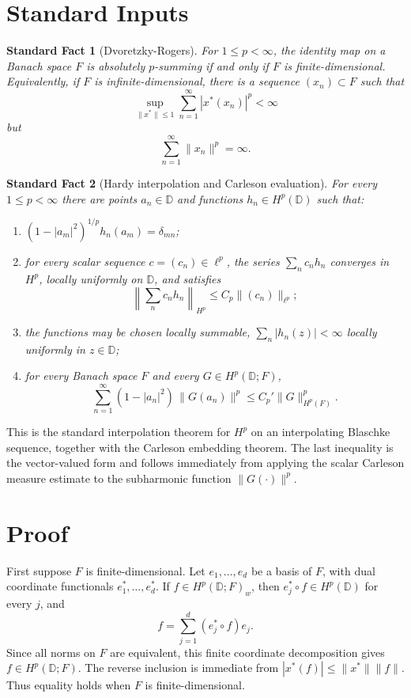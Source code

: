 \documentclass[11pt]{article}
\newtheorem{fact}{Standard Fact}
\newcommand{\D}{\mathbb D}
\begin{document}
\section*{Standard Inputs}

\begin{fact}[Dvoretzky-Rogers]
For \(1\le p<\infty\), the identity map on a Banach space \(F\) is absolutely
\(p\)-summing if and only if \(F\) is finite-dimensional.  Equivalently, if
\(F\) is infinite-dimensional, there is a sequence \((x_n)\subset F\) such
that
\[
  \sup_{\|x^*\|\le1}\sum_{n=1}^\infty |x^*(x_n)|^p<\infty
\]
but
\[
  \sum_{n=1}^\infty \|x_n\|^p=\infty.
\]
\end{fact}

\begin{fact}[Hardy interpolation and Carleson evaluation]
For every \(1\le p<\infty\) there are points \(a_n\in\D\) and functions
\(h_n\in H^p(\D)\) such that:
\begin{enumerate}
\item \((1-|a_m|^2)^{1/p}h_n(a_m)=\delta_{mn}\);
\item for every scalar sequence \(c=(c_n)\in\ell^p\), the series
      \(\sum_n c_nh_n\) converges in \(H^p\), locally uniformly on \(\D\), and
      satisfies
      \[
        \left\|\sum_n c_nh_n\right\|_{H^p}
        \le C_p\|(c_n)\|_{\ell^p};
      \]
\item the functions may be chosen locally summable,
      \(\sum_n |h_n(z)|<\infty\) locally uniformly in \(z\in\D\);
\item for every Banach space \(F\) and every \(G\in H^p(\D;F)\),
      \[
        \sum_{n=1}^\infty
        (1-|a_n|^2)\,\|G(a_n)\|^p
        \le C_p'\|G\|_{H^p(F)}^p .
      \]
\end{enumerate}
\end{fact}

\noindent
This is the standard interpolation theorem for \(H^p\) on an interpolating
Blaschke sequence, together with the Carleson embedding theorem.  The last
inequality is the vector-valued form and follows immediately from applying
the scalar Carleson measure estimate to the subharmonic function
\(\|G(\cdot)\|^p\).

\section*{Proof}

First suppose \(F\) is finite-dimensional.  Let \(e_1,\ldots,e_d\) be a basis
of \(F\), with dual coordinate functionals \(e_1^*,\ldots,e_d^*\).  If
\(f\in H^p(\D;F)_w\), then \(e_j^*\circ f\in H^p(\D)\) for every \(j\), and
\[
  f=\sum_{j=1}^d (e_j^*\circ f)e_j.
\]
Since all norms on \(F\) are equivalent, this finite coordinate decomposition
gives \(f\in H^p(\D;F)\).  The reverse inclusion is immediate from
\(|x^*(f)|\le \|x^*\|\|f\|\).  Thus equality holds when \(F\) is
finite-dimensional.
\end{document}
